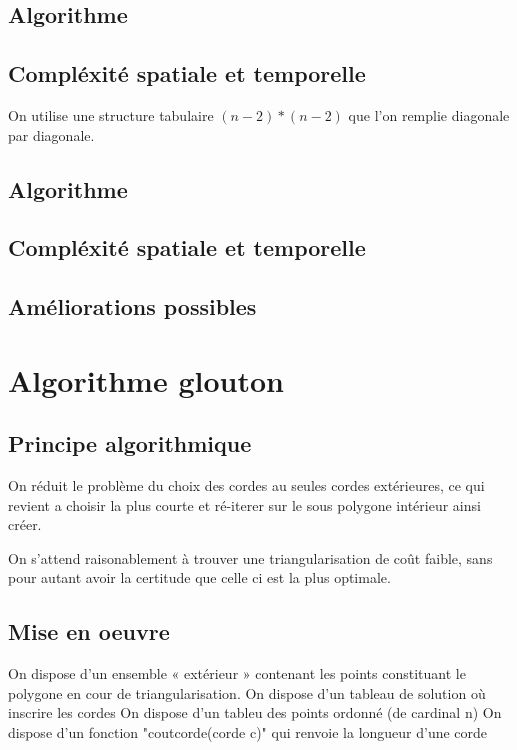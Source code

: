 \documentclass[a4paper,10pt]{article}
\begin{document}
\subsection{Algorithme}

 
 
\subsection{Compléxité spatiale et temporelle}
On utilise une structure tabulaire $(n-2)*(n-2)$ que l'on remplie diagonale par diagonale.


 
 

\subsection{Algorithme}

\subsection{Compléxité spatiale et temporelle}

\subsection{Améliorations possibles}

\section{Algorithme glouton}


\subsection{Principe algorithmique}

On réduit le problème du choix des cordes au seules cordes extérieures, ce qui revient a choisir la plus courte et ré-iterer sur le sous polygone intérieur ainsi créer.

On s'attend raisonablement à trouver une triangularisation de coût faible, sans pour autant avoir la certitude que celle ci est la plus optimale.

\subsection{Mise en oeuvre}
 

On dispose d'un ensemble « extérieur » contenant les points constituant le polygone en cour de triangularisation.
On dispose d'un tableau de solution où inscrire les cordes
On dispose d'un tableu des points ordonné (de cardinal n)
On dispose d'un fonction "coutcorde(corde c)" qui renvoie la longueur d'une corde
 
\end{document}
